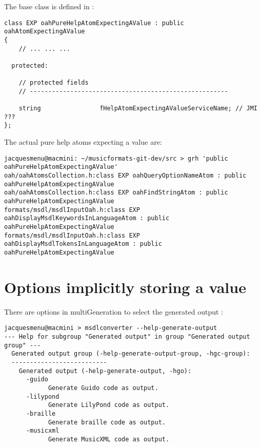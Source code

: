 The base  class is defined in :
\begin{lstlisting}[language=CPlusPlus]
class EXP oahPureHelpAtomExpectingAValue : public oahAtomExpectingAValue
{
	// ... ... ...

  protected:

    // protected fields
    // ------------------------------------------------------

    string                fHelpAtomExpectingAValueServiceName; // JMI ???
};

\end{lstlisting}

The actual pure help atoms expecting a value are:
\begin{lstlisting}[language=Terminal]
jacquesmenu@macmini: ~/musicformats-git-dev/src > grh 'public oahPureHelpAtomExpectingAValue'
oah/oahAtomsCollection.h:class EXP oahQueryOptionNameAtom : public oahPureHelpAtomExpectingAValue
oah/oahAtomsCollection.h:class EXP oahFindStringAtom : public oahPureHelpAtomExpectingAValue
formats/msdl/msdlInputOah.h:class EXP oahDisplayMsdlKeywordsInLanguageAtom : public oahPureHelpAtomExpectingAValue
formats/msdl/msdlInputOah.h:class EXP oahDisplayMsdlTokensInLanguageAtom : public oahPureHelpAtomExpectingAValue
\end{lstlisting}


\section{Options implicitly storing a value}

There are options in multiGeneration to select the generated output :
\begin{lstlisting}[language=Terminal]
jacquesmenu@macmini > msdlconverter --help-generate-output
--- Help for subgroup "Generated output" in group "Generated output group" ---
  Generated output group (-help-generate-output-group, -hgc-group):
  --------------------------
    Generated output (-help-generate-output, -hgo):
      -guido
            Generate Guido code as output.
      -lilypond
            Generate LilyPond code as output.
      -braille
            Generate braille code as output.
      -musicxml
            Generate MusicXML code as output.
\end{lstlisting}

